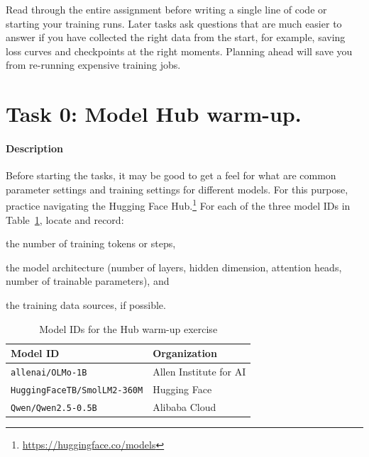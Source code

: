 \begin{tcolorbox}[readfirstbox]
Read through the entire assignment before writing a single line of code or starting your training runs.
Later tasks ask questions that are much easier to answer if you have collected the right data from the start, for example, saving loss curves and checkpoints at the right moments.
Planning ahead will save you from re-running expensive training jobs.
\end{tcolorbox}

\section{Task 0: Model Hub warm-up.}
\paragraph{Description} Before starting the tasks, it may be good to get a feel for what are common parameter settings and training settings for different models. For this purpose, practice navigating the Hugging Face Hub.\footnote{\url{https://huggingface.co/models}}  For each of the three model IDs in Table~\ref{tab:hub-warmup}, locate and record:
\begin{enumerate*}[label=(\arabic*)]
    \item the number of training tokens or steps,
    \item the model architecture (number of layers, hidden dimension, attention heads, number of trainable parameters), and
    \item the training data sources, if possible.
\end{enumerate*}

\begin{table}[h]
\centering
\caption{Model IDs for the Hub warm-up exercise}
\label{tab:hub-warmup}
\begin{tabular}{ll}
\toprule
\textbf{Model ID} & \textbf{Organization} \\
\midrule
\texttt{allenai/OLMo-1B}            & Allen Institute for AI \\
\texttt{HuggingFaceTB/SmolLM2-360M} & Hugging Face \\
\texttt{Qwen/Qwen2.5-0.5B}          & Alibaba Cloud \\
\bottomrule
\end{tabular}
\end{table}

